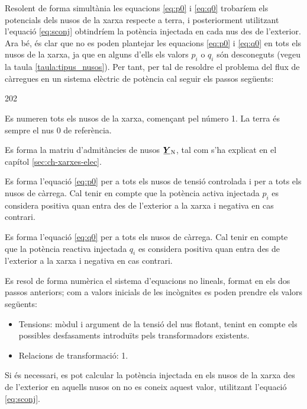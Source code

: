 Resolent de forma simultània les equacions \eqref{eq:p0} i
\eqref{eq:q0} trobaríem els potencials dels nusos de la xarxa
respecte a  terra, i posteriorment utilitzant l'equació
\eqref{eq:sconj} obtindríem la potència injectada en cada nus des
de l'exterior. Ara bé, és clar que no es poden plantejar les
equacions \eqref{eq:p0} i \eqref{eq:q0} en tots els nusos de la
xarxa, ja que en alguns d'ells els valors $p_i$ o $q_i$ són
desconeguts (vegeu la taula \vref{taula:tipus_nusos}). Per tant, per
tal de resoldre el problema del flux de càrregues en un sistema
elèctric de potència cal seguir els passos següents:
\begin{dingautolist}{202}
    \item Es numeren tots els nusos de la xarxa, començant pel número 1. La terra és sempre el nus 0 de referència.
   \item Es forma la matriu d'admitàncies de nusos $\mcmplx{Y}\ped{N}$, tal com s'ha
   explicat en el capítol \ref{sec:ch-xarxes-elec}.
   \item Es forma l'equació \eqref{eq:p0} per a tots els nusos de tensió controlada i per
   a tots els nusos de càrrega. Cal tenir en compte que la potència activa  injectada $p_i$ es considera
   positiva quan entra des de l'exterior a la xarxa i negativa en cas contrari.
   \item Es forma l'equació \eqref{eq:q0} per a tots els nusos de càrrega. Cal tenir en compte
   que la potència reactiva injectada $q_i$  es considera positiva quan entra des de l'exterior a la xarxa i negativa en cas contrari.
   \item Es resol de forma numèrica el sistema d'equacions no lineals, format en els dos
   passos anteriors; com a valors inicials de les incògnites es poden prendre els valors
   següents:
   \begin{itemize}
    \item Tensions: mòdul i argument de la tensió del nus flotant, tenint en compte els possibles desfasaments introduïts pels transformadors existents.
       \item Relacions de transformació: 1.
   \end{itemize}
   \item Si és necessari,  es pot calcular la potència injectada en els nusos de la xarxa
   des de l'exterior en aquells nusos on no es
   coneix aquest valor, utilitzant    l'equació \eqref{eq:sconj}.
\end{dingautolist}


